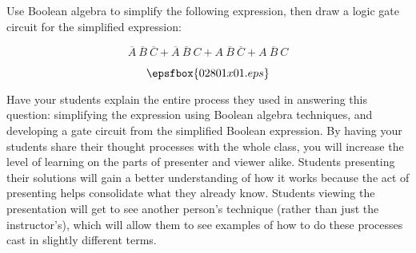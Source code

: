 

Use Boolean algebra to simplify the following expression, then draw a logic gate circuit for the simplified expression:

$$\overline{A} \> \overline{B} \> \overline{C} + \overline{A} \> \overline{B} \> C + A \> \overline{B} \> \overline{C} + A \> \overline{B} \> C$$







$$\epsfbox{02801x01.eps}$$







Have your students explain the entire process they used in answering this question: simplifying the expression using Boolean algebra techniques, and developing a gate circuit from the simplified Boolean expression.  By having your students share their thought processes with the whole class, you will increase the level of learning on the parts of presenter and viewer alike.  Students presenting their solutions will gain a better understanding of how it works because the act of presenting helps consolidate what they already know.  Students viewing the presentation will get to see another person's technique (rather than just the instructor's), which will allow them to see examples of how to do these processes cast in slightly different terms.





